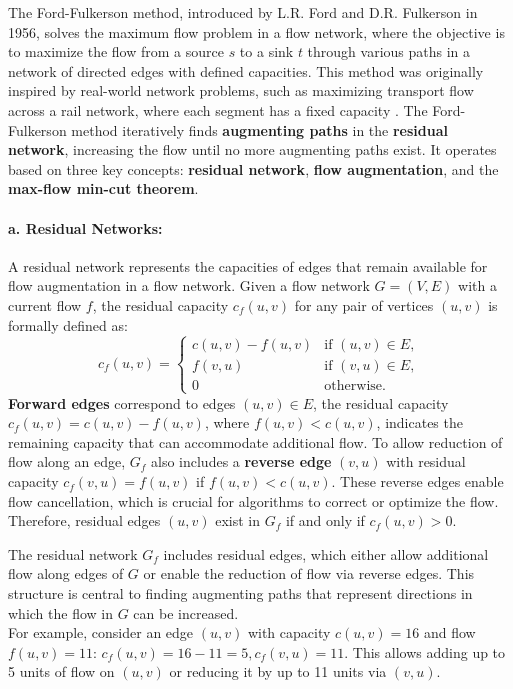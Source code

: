 
\label{ford-fulkerson method}
The Ford-Fulkerson method, introduced by L.R. Ford and D.R. Fulkerson in 1956, solves the maximum flow problem in a flow network, where the objective is to maximize the flow from a source $s$ to a sink $t$ through various paths in a network of directed edges with defined capacities. This method was originally inspired by real-world network problems, such as maximizing transport flow across a rail network, where each segment has a fixed capacity \cite{ford1956flows}. The Ford-Fulkerson method iteratively finds \textbf{augmenting paths} in the \textbf{residual network}, increasing the flow until no more augmenting paths exist. It operates based on three key concepts: \textbf{residual network}, \textbf{flow augmentation}, and the \textbf{max-flow min-cut theorem}.

\paragraph*{a. Residual Networks:}A residual network represents the capacities of edges that remain available for flow augmentation in a flow network. Given a flow network $G = (V, E)$ with a current flow $f$, the residual capacity $c_f(u, v)$  for any pair of vertices $(u, v)$ is formally defined as:
    \[
    c_f(u, v) =
    \begin{cases} 
    c(u, v) - f(u, v) & \text{if } (u, v) \in E, \\
    f(v, u) & \text{if } (v, u) \in E, \\
    0 & \text{otherwise}.
    \end{cases}
    \]
    \textbf{Forward edges} correspond to edges \( (u, v) \in E \), the residual capacity \( c_f(u, v) = c(u, v) - f(u, v) \),  where \( f(u, v) < c(u, v) \), indicates the remaining capacity that can accommodate additional flow. To allow reduction of flow along an edge, \( G_f \) also includes a \textbf{reverse edge} \( (v, u) \) with residual capacity \( c_f(v, u) = f(u, v) \) if $f(u,v) < c(u,v)$. These reverse edges enable flow cancellation, which is crucial for algorithms to correct or optimize the flow. Therefore, residual edges \( (u, v) \) exist in \( G_f \) if and only if \( c_f(u, v) > 0 \).
    
    \noindent The residual network $G_f$ includes residual edges, which either allow additional flow along edges of $G$ or enable the reduction of flow via reverse edges. This structure is central to finding augmenting paths that represent directions in which the flow in $G$ can be increased.\\
    For example, consider an edge $(u, v)$ with capacity \( c(u, v) = 16 \) and flow \( f(u, v) = 11 \): $c_f(u, v) = 16 - 11 = 5, c_f(v, u) = 11$. This allows adding up to 5 units of flow on $(u, v)$ or reducing it by up to 11 units via \( (v, u) \).

